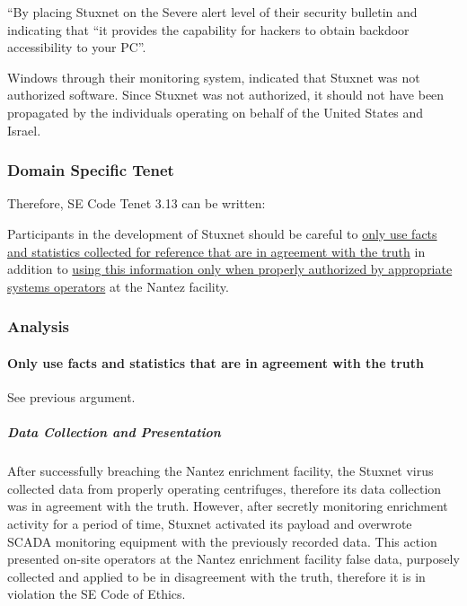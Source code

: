 \documentclass[12pt]{article}
\begin{document}
\begin{multicols}{2}
\begin{displayquote}
“By placing Stuxnet on the Severe alert level of their security bulletin and indicating that “it provides the capability for hackers to obtain backdoor accessibility to your PC”.\cite{w32.stuxnetDossier}
\end{displayquote}

Windows through their monitoring system, indicated that Stuxnet was not authorized software. Since Stuxnet was not authorized, it should not have been propagated by the individuals operating on behalf of the United States and Israel.


\subsubsection{Domain Specific Tenet}

Therefore, SE Code Tenet 3.13 can be written:

\begin{framed}
Participants in the development of Stuxnet should be careful to \ul{only use facts and statistics collected for reference that are in agreement with the truth} in addition to \ul{using this information only when properly authorized by appropriate systems operators} at the Nantez facility.
\end{framed}

\subsubsection{Analysis}

\paragraph{Only use facts and statistics that are in agreement with the truth}

See previous argument.

\subparagraph{Data Collection and Presentation}

After successfully breaching the Nantez enrichment facility, the Stuxnet virus collected data from properly operating centrifuges, therefore its data collection was in agreement with the truth. However, after secretly monitoring enrichment activity for a period of time, Stuxnet activated its payload and overwrote SCADA monitoring equipment with the previously recorded data.\cite{toKillACentrifuge} This action presented on-site operators at the Nantez enrichment facility false data, purposely collected and applied to be in disagreement with the truth, therefore it is in violation the SE Code of Ethics.


\end{multicols}
\end{document}
